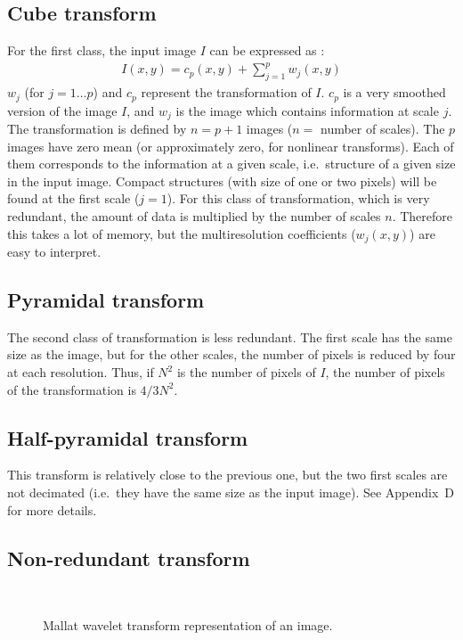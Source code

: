 \subsection*{Cube transform}
For the first class, the input image $I$ can be expressed
as \cite{starck:bij94_1,starck:mur95_1,starck:mur95_3}:
\begin{eqnarray}
I(x,y) =  c_p (x,y) + \sum_{j=1}^{p} w_j(x,y)
\end{eqnarray}
$w_j$ (for $j=1 \dots p$) and $c_p$ represent the transformation of $I$.
$c_p$ is a very smoothed version of the image $I$, and $w_j$ is
the image which contains information at scale $j$. The transformation
is defined by $n=p+1$ images ($n = $ number of scales). The $p$
images have zero mean (or approximately zero, for nonlinear transforms).
Each of them corresponds to the information at a given scale, i.e.\
structure of a given size in the input image. Compact structures
(with size of one or two pixels) will be found at the first scale ($j=1$).
For this class of transformation, which is very redundant, the amount 
of data is multiplied by the number of scales $n$. Therefore this
takes a lot of memory, but the multiresolution coefficients ($w_j(x,y)$)
are easy to interpret. 

\subsection*{Pyramidal transform}

The second class of transformation is 
less redundant. The first scale has the same size as the image, but
for the other scales, the number of pixels is reduced by four at
each resolution. Thus, if $N^2$ is the number of pixels of $I$, the 
number of pixels of the transformation is $4/3N^2$. 

\subsection*{Half-pyramidal transform}
This transform \cite{wave:bijaoui97} is relatively close to the previous one, but the two first
scales are not decimated (i.e.\ they have the same size as the input image).
See Appendix~D for more details.


\subsection*{Non-redundant transform}
\begin{figure}[htb]
\centerline{
\hbox{
}}
\caption{Mallat wavelet transform representation of an image.}
\label{fig_mallat}
\end{figure}

